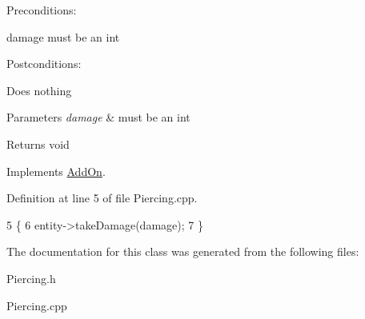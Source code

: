 Preconditions\+:
\begin{DoxyItemize}
\item damage must be an int
\end{DoxyItemize}

Postconditions\+:
\begin{DoxyItemize}
\item Does nothing
\end{DoxyItemize}


\begin{DoxyParams}{Parameters}
{\em damage} & must be an int \\
\hline
\end{DoxyParams}
\begin{DoxyReturn}{Returns}
void 
\end{DoxyReturn}


Implements \hyperlink{classAddOn_ab3aefbc00969fe613ed6d42c4f55c5a2}{Add\+On}.



Definition at line 5 of file Piercing.\+cpp.


\begin{DoxyCode}
5                                     \{
6     entity->takeDamage(damage);
7 \}
\end{DoxyCode}


The documentation for this class was generated from the following files\+:\begin{DoxyCompactItemize}
\item 
Piercing.\+h\item 
Piercing.\+cpp\end{DoxyCompactItemize}
